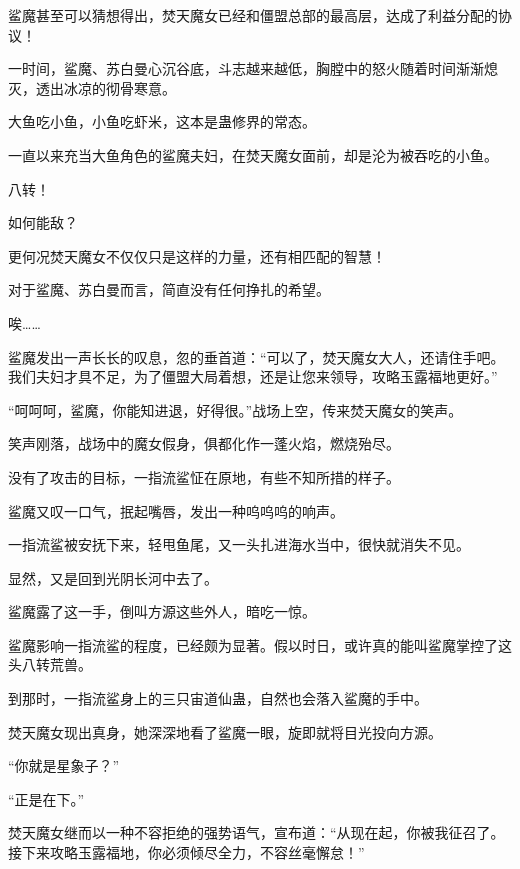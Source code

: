\begin{this_body}
鲨魔甚至可以猜想得出，焚天魔女已经和僵盟总部的最高层，达成了利益分配的协议！

一时间，鲨魔、苏白曼心沉谷底，斗志越来越低，胸膛中的怒火随着时间渐渐熄灭，透出冰凉的彻骨寒意。

大鱼吃小鱼，小鱼吃虾米，这本是蛊修界的常态。

一直以来充当大鱼角色的鲨魔夫妇，在焚天魔女面前，却是沦为被吞吃的小鱼。

八转！

如何能敌？

更何况焚天魔女不仅仅只是这样的力量，还有相匹配的智慧！

对于鲨魔、苏白曼而言，简直没有任何挣扎的希望。

唉……

鲨魔发出一声长长的叹息，忽的垂首道：“可以了，焚天魔女大人，还请住手吧。我们夫妇才具不足，为了僵盟大局着想，还是让您来领导，攻略玉露福地更好。”

“呵呵呵，鲨魔，你能知进退，好得很。”战场上空，传来焚天魔女的笑声。

笑声刚落，战场中的魔女假身，俱都化作一蓬火焰，燃烧殆尽。

没有了攻击的目标，一指流鲨怔在原地，有些不知所措的样子。

鲨魔又叹一口气，抿起嘴唇，发出一种呜呜呜的响声。

一指流鲨被安抚下来，轻甩鱼尾，又一头扎进海水当中，很快就消失不见。

显然，又是回到光阴长河中去了。

鲨魔露了这一手，倒叫方源这些外人，暗吃一惊。

鲨魔影响一指流鲨的程度，已经颇为显著。假以时日，或许真的能叫鲨魔掌控了这头八转荒兽。

到那时，一指流鲨身上的三只宙道仙蛊，自然也会落入鲨魔的手中。

焚天魔女现出真身，她深深地看了鲨魔一眼，旋即就将目光投向方源。

“你就是星象子？”

“正是在下。”

焚天魔女继而以一种不容拒绝的强势语气，宣布道：“从现在起，你被我征召了。接下来攻略玉露福地，你必须倾尽全力，不容丝毫懈怠！”

\end{this_body}

